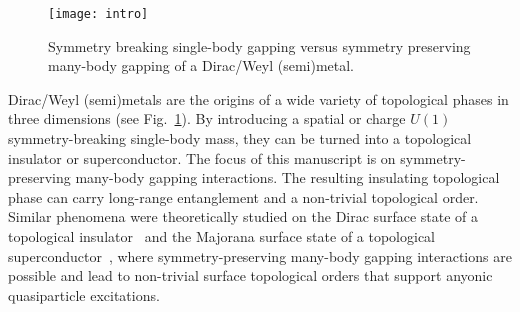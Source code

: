 
\begin{figure}[htbp]
	\texttt{[image: intro]}
	\caption{Symmetry breaking single-body gapping versus symmetry preserving many-body gapping of a Dirac/Weyl (semi)metal.}\label{fig:intro}
\end{figure}

Dirac/Weyl (semi)metals are the origins of a wide variety of topological phases in three dimensions (see Fig.~\ref{fig:intro}). By introducing a spatial or charge $U(1)$ symmetry-breaking single-body mass, they can be turned into a topological insulator or superconductor. The focus of this manuscript is on symmetry-preserving many-body gapping interactions. The resulting insulating topological phase can carry long-range entanglement and a non-trivial topological order. Similar phenomena were theoretically studied on the Dirac surface state of a topological insulator~\cite{WangPotterSenthilgapTI13,MetlitskiKaneFisher13b,ChenFidkowskiVishwanath14,BondersonNayakQi13} and the Majorana surface state of a topological superconductor~\cite{LukaszChenVishwanath,MetlitskiFidkowskiChenVishwanath14}, where symmetry-preserving many-body gapping interactions are possible and lead to non-trivial surface topological orders that support anyonic quasiparticle excitations.

